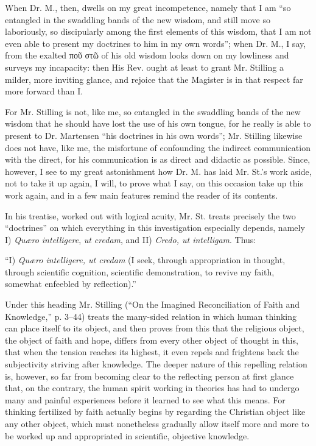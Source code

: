 \documentclass[12pt,a4paper,openany]{book}
\newcommand{\opage}[1]{\marginnote{\footnotesize\textit{[#1]}}}
\begin{document}
When Dr. M., then, dwells on my great incompetence,
namely that I am ``so entangled in the swaddling bands of the
new wisdom, and still move so laboriously, so
discipularly among the first elements of this wisdom, that I am not
even able to present my doctrines to him in
my own words''; when Dr. M., I say, from the exalted
ποῦ στῶ of his old wisdom looks down on my lowliness and
surveys my incapacity: then His Rev. ought at least
to grant Mr. Stilling a milder, more inviting
glance, and rejoice that the Magister is in that respect
far more forward than I.

For Mr. Stilling is not, like me, so entangled
in the swaddling bands of the new wisdom that he should have
lost the use of his own tongue, for he really is able
to present to Dr. Martensen ``his doctrines in his own %
words''; Mr. Stilling likewise does not have, like me, the
misfortune of confounding the indirect communication with the direct,
for his communication is as direct and didactic
as possible. Since, however, I see to my great astonishment
how Dr. M. has laid Mr. St.'s work aside,
not to take it up again, I will, to prove what I
say, on this occasion take up this work again, and in a few
main features remind the reader of its contents.

In his treatise, worked out with logical acuity, Mr. St. treats
precisely the two ``doctrines'' on which everything
in this investigation especially depends, namely I) \textit{Quæro intelligere},
\textit{ut credam}, and II) \textit{Credo, ut intelligam}. Thus:

\setcounter{footnote}{0}%
\opage{15}``I) \textit{Quæro intelligere, ut credam} (I seek, through
appropriation in thought, through scientific cognition, scientific
demonstration, to revive my faith, somewhat enfeebled by reflection).''

Under this heading Mr. Stilling (``On
the Imagined Reconciliation of Faith and Knowledge,'' p. 3--44) treats the
many-sided relation in which human thinking can
place itself to its object, and then proves from this that the religious
object, the object of faith and hope, differs
from every other object of thought in this, that when the tension
reaches its highest, it even repels and frightens back the subjectivity
striving after knowledge. The deeper nature of this repelling
relation is, however, so far from becoming clear to the reflecting
person at first glance that, on the contrary, the human spirit working
in theories has had to undergo
many and painful experiences before it learned to see
what this means. For thinking fertilized by faith actually begins by regarding the Christian object
like any other object, which must nonetheless gradually
allow itself more and more to be worked up and appropriated in scientific,
objective knowledge.
\end{document}
